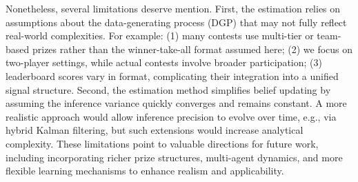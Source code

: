 \documentclass[mnsc]{informs3}
\begin{document}
Nonetheless, several limitations deserve mention.
First, the estimation relies on assumptions about the data-generating process (DGP) that may not fully reflect real-world complexities.
For example:
(1) many contests use multi-tier or team-based prizes rather than the winner-take-all format assumed here;
(2) we focus on two-player settings, while actual contests involve broader participation;
(3) leaderboard scores vary in format, complicating their integration into a unified signal structure.
Second, the estimation method simplifies belief updating by assuming the inference variance quickly converges and remains constant.
A more realistic approach would allow inference precision to evolve over time, e.g., via hybrid Kalman filtering, but such extensions would increase analytical complexity.
These limitations point to valuable directions for future work, including incorporating richer prize structures, multi-agent dynamics, and more flexible learning mechanisms to enhance realism and applicability.




%
%
%
\end{document}
